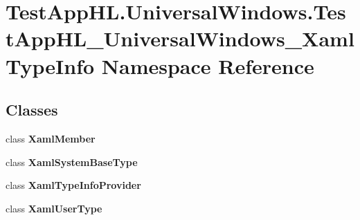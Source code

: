\hypertarget{namespace_test_app_h_l_1_1_universal_windows_1_1_test_app_h_l___universal_windows___xaml_type_info}{}\section{Test\+App\+H\+L.\+Universal\+Windows.\+Test\+App\+H\+L\+\_\+\+Universal\+Windows\+\_\+\+Xaml\+Type\+Info Namespace Reference}
\label{namespace_test_app_h_l_1_1_universal_windows_1_1_test_app_h_l___universal_windows___xaml_type_info}
\subsection*{Classes}
\begin{DoxyCompactItemize}
\item 
class {\bfseries Xaml\+Member}
\item 
class {\bfseries Xaml\+System\+Base\+Type}
\item 
class {\bfseries Xaml\+Type\+Info\+Provider}
\item 
class {\bfseries Xaml\+User\+Type}
\end{DoxyCompactItemize}
